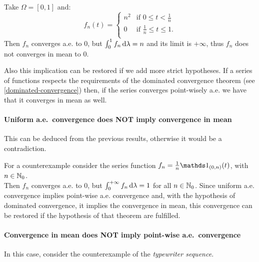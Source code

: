 Take $\Omega = [0, 1]$ and:
$$f_n(t)=\begin{cases}
	n^2 & \text{if } 0\leq t < \frac 1 n \\
	0 & \text{if } \frac 1 n \leq t \leq 1.\\
	\end{cases}$$
Then $f_n$ converges a.e. to $0$, but $\int_{0}^{1} f_n \,\mathrm d \lambda = n$ and its limit is $+\infty$, thus $f_n$ does not converges in mean to $0$.

Also this implication can be restored if we add more strict hypotheses. If a series of functions respects the requirements of the dominated convergence theorem (see \vref{dominated-convergence}) then, if the series converges point-wisely a.e. we have that it converges in mean as well.

\paragraph{Uniform a.e.\ convergence does NOT imply convergence in mean} This can be deduced from the previous results, otherwise it would be a contradiction.

For a counterexample consider the series function $f_n = \tfrac 1 n \Ind_{(0,n)}(t)$, with $n \in \mathbb N_0$.\\
Then $f_n$ converges a.e. to $0$, but $\int_{0}^{+\infty}f_n \, \mathrm d \lambda = 1$ for all $n\in \mathbb N_0$.
Since uniform a.e. convergence implies point-wise a.e. convergence and, with the hypothesis of dominated convergence, it implies the convergence in mean, this convergence can be restored if the hypothesis of that theorem are fulfilled.

\paragraph{Convergence in mean does NOT imply point-wise a.e.\ convergence} In this case, consider the counterexample of the \textit{typewriter sequence}.

